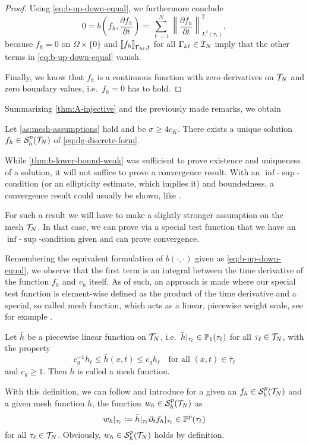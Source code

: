 \documentclass[../thesis.tex]{subfiles}
\begin{document}
\begin{proof}
Using \cref{eq:b-up-down-equal}, we furthermore conclude
\[
	0 = b\left(f_h,  \frac{\partial f_h}{\partial t}\right) = \sum_{\ell=1}^N \left\| \frac{\partial f_h}{\partial t} \right\|_{L^2(\tau_\ell)}^2,
\]
because $f_h = 0$ on $\Omega \times \{ 0 \}$ and ${\lbrack\!\lbrack} f_h {\rbrack\!\rbrack}_{\Gamma_{k\ell}, t}$ for all $\Gamma_{k\ell} \in \mathcal{I}_N$ imply that the other terms in \cref{eq:b-up-down-equal} vanish.

Finally, we know that $f_h$ is a continuous function with zero derivatives on $\mathcal{T}_N$ and zero boundary values, i.e.\ $f_h = 0$ has to hold.  
\end{proof}
Summarizing \cref{thm:A-injective} and the previously made remarks, we obtain
\begin{theorem}
\label{thm:A-bijective}
Let \cref{as:mesh-assumptions} hold and be $\sigma \geq 4 c_K$. There exists a unique solution $f_h \in \mathcal{S}_h^p(\mathcal{T}_N)$ of \cref{eq:dg-discrete-form}.
\end{theorem}

While \cref{thm:b-lower-bound-weak} was sufficient to prove existence and uniqueness of a solution, it will not suffice to prove a convergence result. With an $\inf$-$\sup$-condition (or an ellipticity estimate, which implies it) and boundedness, a convergence result could usually be shown, like \cite[3.7 Hilfssatz]{Braess}.

For such a result we will have to make a slightly stronger assumption on the mesh $\mathcal{T}_N$. In that case, we can prove via a special test function that we have an $\inf$-$\sup$-condition given and can prove convergence.

Remembering the equivalent formulation of $b(\cdot, \cdot)$ given as \cref{eq:b-up-down-equal}, we observe that the first term is an integral between the time derivative of the function $f_h$ and $v_h$ itself.
As of such, an approach is made where our special test function is element-wise defined as the product of the time derivative and a special, so called mesh function, which acts as a linear, piecewise weight scale, see for example \cite{Neumueller}.
\begin{definition}
Let $\bar{h}$ be a piecewise linear function on $\mathcal{T}_N$, i.e.\ $\bar{h}|_{\tau_\ell} \in \mathbb{P}_1(\tau_\ell)$ for all $\tau_\ell \in \mathcal{T}_N$, with the property
\[
	c_g^{-1} h_\ell \leq \bar{h}(x, t) \leq c_g h_\ell \quad \text{for all } (x, t) \in \bar{\tau}_\ell
\]
and $c_g \geq 1$. Then $\bar{h}$ is called a mesh function.
\end{definition}
With this definition, we can follow \cite{Neumueller} and introduce for a given an $f_h \in \mathcal{S}_h^p(\mathcal{T}_N)$ and a given mesh function $\bar{h}$, the function $w_h \in \mathcal{S}_h^p(\mathcal{T}_N)$ as
\begin{equation}
\label{eq:wh}
	w_h|_{\tau_\ell} \coloneqq \bar{h}|_{\tau_\ell} \partial_t f_h|_{\tau_\ell} \in \mathbb{P}^p(\tau_\ell)
\end{equation}
for all $\tau_\ell \in \mathcal{T}_N$. Obviously, $w_h \in \mathcal{S}_h^p(\mathcal{T}_N)$ holds by definition.
\end{document}
